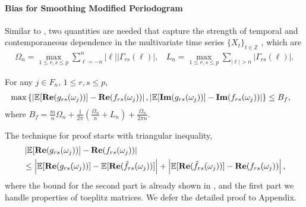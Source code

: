 \paragraph{Bias for Smoothing Modified Periodogram} Similar to \cite{sun2018large}, two quantities are needed that capture the strength of temporal and contemporaneous dependence in the multivariate time series $\{X_t\}_{t \in \mathbb{Z}}$ , which are 
\begin{eqnarray}
\Omega_{n} = \max_{1 \le r,s \le p} \sum_{\ell=-n}^n |\ell| |\Gamma_{rs}(\ell)|, ~~~~ L_n = \max_{1 \le r,s \le p}\sum_{|\ell|>n} |\Gamma_{rs}(\ell)|.
\end{eqnarray}
\begin{lem}
\label{lemma:bound_deviation}
For any $j\in F_n$, $1\le r, s\le p$, 
\begin{equation}
\begin{aligned}
&\max\left\{\left|\mathbb{E}[{\bf Re}(g_{rs}(\omega_j))] - {\bf Re}(f_{rs}(\omega_j))\right|, \left|\mathbb{E}[{\bf Im}(g_{rs}(\omega_j))] - {\bf Im}(f_{rs}(\omega_j))\right|\right\} \le B_f,
\end{aligned}
\end{equation}
where $B_f = \frac{m}{n}\Omega_n + \frac{1}{2\pi}\left(\frac{\Omega_n}{n}+L_n\right) +\frac{\Omega_n}{2\pi n}$.
\end{lem}
The technique for proof starts with triangular inequality, 
\begin{equation}
\begin{aligned}
&\left|\mathbb{E}[{\bf Re}(g_{rs}(\omega_j))] - {\bf Re}(f_{rs}(\omega_j))\right| \\
&\le \left|\mathbb{E}[{\bf Re}(g_{rs}(\omega_j))] - \mathbb{E}[{\bf Re}(\hat{f}_{rs}(\omega_j))]\right|+\left|\mathbb{E}[{\bf Re}(\hat{f}_{rs}(\omega_j))] - {\bf Re}(f_{rs}(\omega_j))\right|, 
\end{aligned}
\end{equation}
where the bound for the second part is already shown in \cite{sun2018large}, and the first part we handle properties of toeplitz matrices. We defer the detailed proof to Appendix. 
